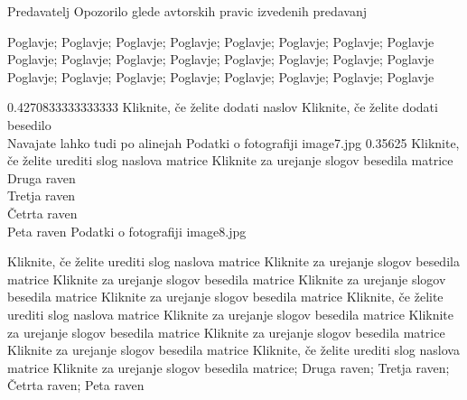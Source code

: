 \documentclass[aspectratio=169]{beamer}
\begin{document}

\ULFECopyrightSlide
  {Predavatelj}
  {Opozorilo glede avtorskih pravic izvedenih predavanj}

  {Poglavje; Poglavje; Poglavje; Poglavje; Poglavje; Poglavje; Poglavje; Poglavje}
  {Poglavje; Poglavje; Poglavje; Poglavje; Poglavje; Poglavje; Poglavje; Poglavje}
  {Poglavje; Poglavje; Poglavje; Poglavje; Poglavje; Poglavje; Poglavje; Poglavje}


\ULFEPhotoLeftContentSlide
  {0.4270833333333333}
  {Kliknite, če želite dodati naslov}
  {Kliknite, če želite dodati besedilo\\Navajate lahko tudi po alinejah}
  {Podatki o fotografiji}
  {image7.jpg}
\ULFEPhotoRightContentSlide
  {0.35625}
  {Kliknite, če želite urediti slog naslova matrice}
  {Kliknite za urejanje slogov besedila matrice\\Druga raven\\Tretja raven\\Četrta raven\\Peta raven}
  {Podatki o fotografiji}
  {image8.jpg}


  {Kliknite, če želite urediti slog naslova matrice}
  {Kliknite za urejanje slogov besedila matrice}
  {Kliknite za urejanje slogov besedila matrice}
  {Kliknite za urejanje slogov besedila matrice}
  {Kliknite za urejanje slogov besedila matrice}
  {Kliknite, če želite urediti slog naslova matrice}
  {Kliknite za urejanje slogov besedila matrice}
  {Kliknite za urejanje slogov besedila matrice}
  {Kliknite za urejanje slogov besedila matrice}
  {Kliknite za urejanje slogov besedila matrice}
\ULFEPlainTextSlide
  {Kliknite, če želite urediti slog naslova matrice}
  {Kliknite za urejanje slogov besedila matrice; Druga raven; Tretja raven; Četrta raven; Peta raven}
\end{document}
